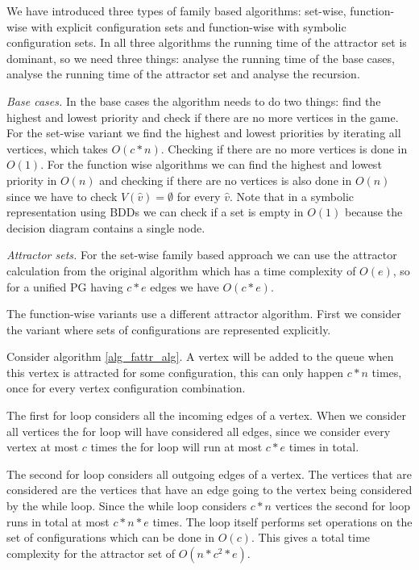 We have introduced three types of family based algorithms: set-wise, function-wise with explicit configuration sets and function-wise with symbolic configuration sets. In all three algorithms the running time of the attractor set is dominant, so we need three things: analyse the running time of the base cases, analyse the running time of the attractor set and analyse the recursion.

\textit{Base cases.} In the base cases the algorithm needs to do two things: find the highest and lowest priority and check if there are no more vertices in the game. For the set-wise variant we find the highest and lowest priorities by iterating all vertices, which takes $O(c*n)$. Checking if there are no more vertices is done in $O(1)$. For the function wise algorithms we can find the highest and lowest priority in $O(n)$ and checking if there are no vertices is also done in $O(n)$ since we have to check $V(\hat{v}) = \emptyset$ for every $\hat{v}$. Note that in a symbolic representation using BDDs we can check if a set is empty in $O(1)$ because the decision diagram contains a single node.

\textit{Attractor sets.} For the set-wise family based approach we can use the attractor calculation from the original algorithm which has a time complexity of $O(e)$, so for a unified PG having $c*e$ edges we have $O(c*e)$.

The function-wise variants use a different attractor algorithm. First we consider the variant where sets of configurations are represented explicitly.

Consider algorithm \ref{alg_fattr_alg}. A vertex will be added to the queue when this vertex is attracted for some configuration, this can only happen $c*n$ times, once for every vertex configuration combination. 

The first for loop considers all the incoming edges of a vertex. When we consider all vertices the for loop will have considered all edges, since we consider every vertex at most $c$ times the for loop will run at most $c*e$ times in total.

The second for loop considers all outgoing edges of a vertex. The vertices that are considered are the vertices that have an edge going to the vertex being considered by the while loop. Since the while loop considers $c*n$ vertices the second for loop runs in total at most $c * n * e$ times. The loop itself performs set operations on the set of configurations which can be done in $O(c)$. This gives a total time complexity for the attractor set of $O(n*c^2*e)$.

